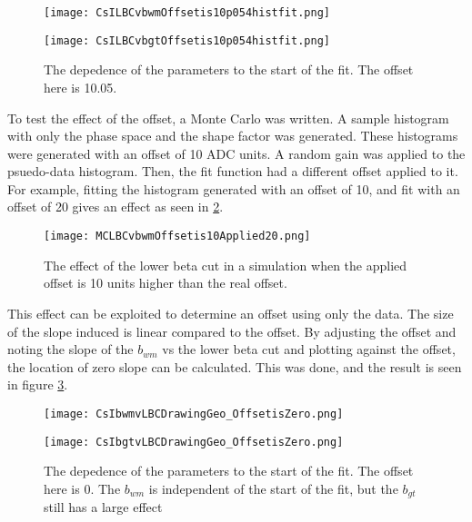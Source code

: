 \documentclass[main.tex]{subfiles}
\begin{document}
\begin{figure}
    \centering
    \begin{minipage}{0.50\textwidth}
        \centerline{\texttt{[image: CsILBCvbwmOffsetis10p054histfit.png]}}
    \end{minipage}\hfill
    \begin{minipage}{0.50\textwidth}
        \centerline{\texttt{[image: CsILBCvbgtOffsetis10p054histfit.png]}}
    \end{minipage}
    \caption{The depedence of the parameters to the start of the fit.
	     The offset here is 10.05.}
    \label{fig:offset10LBCeffect}
\end{figure}

To test the effect of the offset, a Monte Carlo was written.
A sample histogram with only the phase space and the shape factor was generated. 
These histograms were generated with an offset of 10 ADC units.
A random gain was applied to the psuedo-data histogram. 
Then, the fit function had a different offset applied to it.
For example, fitting the histogram generated with an offset of 10, and fit with an offset of 20 gives an effect as seen in \ref{fig:MCoffset10applied20}.

\begin{figure}
	\centerline{\texttt{[image: MCLBCvbwmOffsetis10Applied20.png]}}
	\caption{The effect of the lower beta cut in a simulation when the applied offset is 10 units higher than the real offset.}
	\label{fig:MCoffset10applied20}
\end{figure}

This effect can be exploited to determine an offset using only the data. 
The size of the slope induced is linear compared to the offset.
By adjusting the offset and noting the slope of the $b_{wm}$ vs the lower beta cut and plotting against the offset, the location of zero slope can be calculated.
This was done, and the result is seen in figure \ref{fig:offset0LBCeffect}.

\begin{figure}
    \centering
    \begin{minipage}{0.50\textwidth}
        \centerline{\texttt{[image: CsIbwmvLBCDrawingGeo\_OffsetisZero.png]}}
    \end{minipage}\hfill
    \begin{minipage}{0.50\textwidth}
        \centerline{\texttt{[image: CsIbgtvLBCDrawingGeo\_OffsetisZero.png]}}
    \end{minipage}
    \caption{The depedence of the parameters to the start of the fit.
	     The offset here is 0.
	     The $b_{wm}$ is independent of the start of the fit, but the $b_{gt}$ still has a large effect}
    \label{fig:offset0LBCeffect}
\end{figure}
\end{document}
